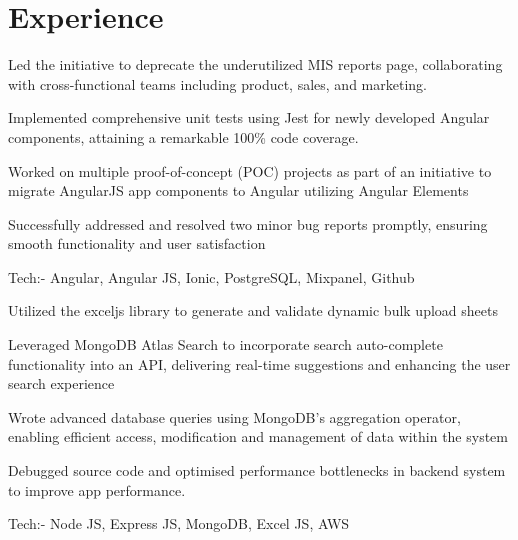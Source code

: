 \documentclass[]{deedy-resume-openfont}
\begin{document}
\hfill
\begin{minipage}[t]{0.66\textwidth} 


\section{Experience}

\vspace{\topsep}
\begin{tightemize}
\item Led the initiative to deprecate the underutilized MIS reports page, collaborating with cross-functional teams including product, sales, and marketing.
\item Implemented comprehensive unit tests using Jest for newly developed Angular components, attaining a remarkable 100\% code coverage.
\item Worked on multiple proof-of-concept (POC) projects as part of an initiative to migrate AngularJS app components to Angular utilizing Angular Elements
\item Successfully addressed and resolved two minor bug reports promptly, ensuring smooth functionality and user satisfaction
\item Tech:- Angular, Angular JS, Ionic, PostgreSQL, Mixpanel, Github
\end{tightemize}
\sectionsep

\begin{tightemize}
\item Utilized the exceljs library to generate and validate dynamic bulk upload sheets
\item Leveraged MongoDB Atlas Search to incorporate search auto-complete functionality into an API, delivering real-time suggestions and enhancing the user search experience
\item Wrote advanced database queries using MongoDB’s aggregation operator, enabling efficient access, modification and management of data within the system
\item Debugged source code and optimised performance bottlenecks in backend system to improve app performance.
\item Tech:- Node JS, Express JS, MongoDB, Excel JS, AWS
\end{tightemize}
\sectionsep


\end{minipage}
\end{document}

